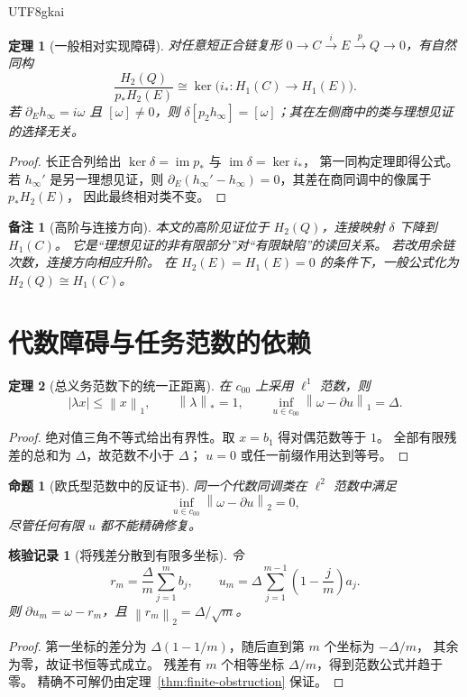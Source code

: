 \documentclass[12pt,a4paper,openany]{report}
\newtheorem{theorem}{定理}[chapter]
\newtheorem{proposition}{命题}[chapter]
\newtheorem{remark}{备注}[chapter]
\newtheorem{Certificate}{核验记录}[chapter]
\numberwithin{equation}{chapter}
\newcommand{\im}{\operatorname{im}}
\newcommand{\Norm}[1]{\left\lVert#1\right\rVert}
\begin{document}
\begin{CJK*}{UTF8}{gkai}
\begin{theorem}[一般相对实现障碍]
\label{thm:relative-general}
对任意短正合链复形
$0\to C\xrightarrow{i}E\xrightarrow{p}Q\to0$，有自然同构
\[
 \boxed{
 \frac{H_2(Q)}{p_*H_2(E)}
 \cong
 \ker\bigl(i_*:H_1(C)\to H_1(E)\bigr)}.
\]
若 $\partial_Eh_\infty=i\omega$ 且 $[\omega]\ne0$，则
$\delta[p_2h_\infty]=[\omega]$；其在左侧商中的类与理想见证的选择无关。
\end{theorem}
\begin{proof}
长正合列给出 $\ker\delta=\im p_*$ 与 $\im\delta=\ker i_*$，
第一同构定理即得公式。
若 $h_\infty'$ 是另一理想见证，则
$\partial_E(h_\infty'-h_\infty)=0$，其差在商同调中的像属于 $p_*H_2(E)$，
因此最终相对类不变。
\end{proof}

\begin{remark}[高阶与连接方向]
本文的高阶见证位于 $H_2(Q)$，连接映射 $\delta$ 下降到 $H_1(C)$。
它是“理想见证的非有限部分”对“有限缺陷”的读回关系。
若改用余链次数，连接方向相应升阶。
在 $H_2(E)=H_1(E)=0$ 的条件下，一般公式化为 $H_2(Q)\cong H_1(C)$。
\end{remark}

\section{代数障碍与任务范数的依赖}

\begin{theorem}[总义务范数下的统一正距离]
\label{thm:l1-distance}
在 $c_{00}$ 上采用 $\ell^1$ 范数，则
\[
 |\lambda x|\le\Norm x_1,\qquad\Norm\lambda_*=1,\qquad
 \boxed{\inf_{u\in c_{00}}\Norm{\omega-\partial u}_1=\Delta}.
\]
\end{theorem}
\begin{proof}
绝对值三角不等式给出有界性。取 $x=b_1$ 得对偶范数等于 $1$。
全部有限残差的总和为 $\Delta$，故范数不小于 $\Delta$；
$u=0$ 或任一前缀作用达到等号。
\end{proof}

\begin{proposition}[欧氏型范数中的反证书]
\label{prop:l2-counter}
同一个代数同调类在 $\ell^2$ 范数中满足
\[
 \inf_{u\in c_{00}}\Norm{\omega-\partial u}_2=0,
\]
尽管任何有限 $u$ 都不能精确修复。
\end{proposition}
\begin{Certificate}[将残差分散到有限多坐标]
令
\[
 r_m=\frac{\Delta}{m}\sum_{j=1}^m b_j,\qquad
 u_m=\Delta\sum_{j=1}^{m-1}\left(1-\frac jm\right)a_j.
\]
则 $\partial u_m=\omega-r_m$，且
$\Norm{r_m}_2=\Delta/\sqrt m$。
\end{Certificate}
\begin{proof}
第一坐标的差分为 $\Delta(1-1/m)$，随后直到第 $m$ 个坐标为 $-\Delta/m$，
其余为零，故证书恒等式成立。
残差有 $m$ 个相等坐标 $\Delta/m$，得到范数公式并趋于零。
精确不可解仍由定理~\ref{thm:finite-obstruction} 保证。
\end{proof}


\end{CJK*}
\end{document}
